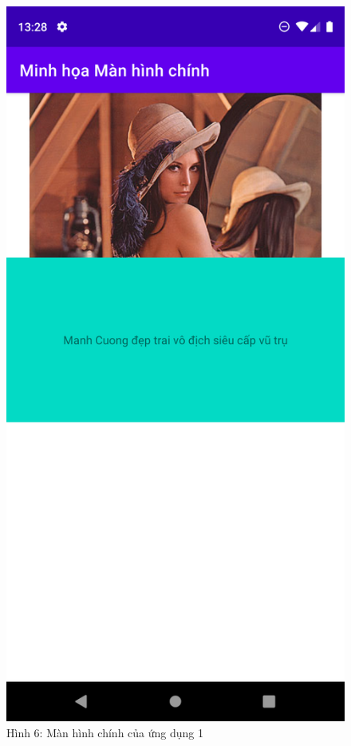 \documentclass{beamer}
\begin{document}
\begin{frame}
    \begin{columns}
        \begin{figure}
            \centering
            \includegraphics[height=0.7\textheight]{images/10.png}
            \caption{\centering\tiny{Hình 6: Màn hình chính của ứng dụng 1}}


\end{figure}
\end{columns}
\end{frame}
\end{document}

